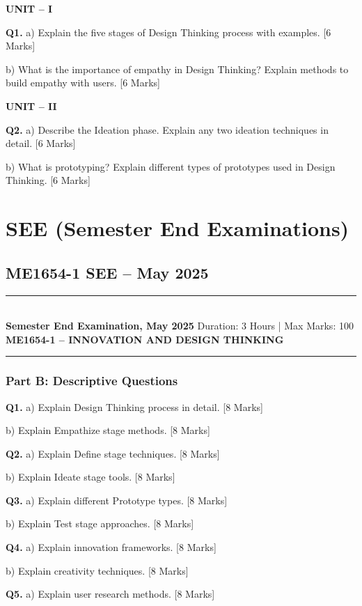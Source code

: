 \documentclass[11pt,a4paper]{article}
\newcommand{\examheader}[4]{
\noindent\rule{\textwidth}{0.5pt}\\
\textbf{#1} \hfill Duration: #3 | Max Marks: #4\\
\textbf{#2}\\
\rule{\textwidth}{0.5pt}
\vspace{0.2cm}
}
\begin{document}
\textbf{UNIT -- I}

\textbf{Q1.} a) Explain the five stages of Design Thinking process with examples. \hfill [6 Marks]

b) What is the importance of empathy in Design Thinking? Explain methods to build empathy with users. \hfill [6 Marks]

\textbf{UNIT -- II}

\textbf{Q2.} a) Describe the Ideation phase. Explain any two ideation techniques in detail. \hfill [6 Marks]

b) What is prototyping? Explain different types of prototypes used in Design Thinking. \hfill [6 Marks]

\section{SEE (Semester End Examinations)}

\subsection{ME1654-1 SEE -- May 2025}
\examheader{Semester End Examination, May 2025}{ME1654-1 -- INNOVATION AND DESIGN THINKING}{3 Hours}{100}

\subsubsection*{Part B: Descriptive Questions}

\textbf{Q1.} a) Explain Design Thinking process in detail. \hfill [8 Marks]

b) Explain Empathize stage methods. \hfill [8 Marks]

\textbf{Q2.} a) Explain Define stage techniques. \hfill [8 Marks]

b) Explain Ideate stage tools. \hfill [8 Marks]

\textbf{Q3.} a) Explain different Prototype types. \hfill [8 Marks]

b) Explain Test stage approaches. \hfill [8 Marks]

\textbf{Q4.} a) Explain innovation frameworks. \hfill [8 Marks]

b) Explain creativity techniques. \hfill [8 Marks]

\textbf{Q5.} a) Explain user research methods. \hfill [8 Marks]
\end{document}
